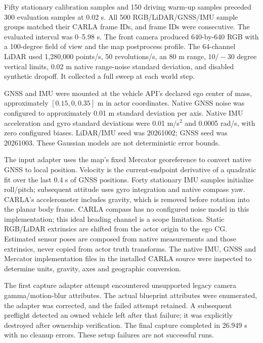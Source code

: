 \documentclass[11pt]{article}
\begin{document}
Fifty stationary calibration samples and 150 driving warm-up samples preceded
300 evaluation samples at 0.02 s. All 500 RGB/LiDAR/GNSS/IMU sample groups
matched their CARLA frame IDs, and frame IDs were consecutive. The evaluated
interval was 0--5.98 s. The front camera produced 640-by-640 RGB with a
100-degree field of view and the map postprocess profile. The 64-channel
LiDAR used 1,280,000 points/s, 50 revolutions/s, an 80 m range,
$10/-30$ degree vertical limits, 0.02 m native range-noise standard deviation,
and disabled synthetic dropoff. It collected a full sweep at each world step.

GNSS and IMU were mounted at the vehicle API's declared ego center of mass,
approximately $[0.15,0,0.35]$ m in actor coordinates. Native GNSS noise was
configured to approximately 0.01 m standard deviation per axis. Native IMU
acceleration and gyro standard deviations were 0.01 m/s$^2$ and
0.0005 rad/s, with zero configured biases. LiDAR/IMU seed was 20261002;
GNSS seed was 20261003. These Gaussian models are not deterministic error bounds.

The input adapter uses the map's fixed Mercator georeference to convert native
GNSS to local position. Velocity is the current-endpoint derivative of a
quadratic fit over the last 0.4 s of GNSS positions. Forty stationary IMU
samples initialize roll/pitch; subsequent attitude uses gyro integration and
native compass yaw. CARLA's accelerometer includes gravity, which is removed
before rotation into the planar body frame. CARLA compass has no configured
noise model in this implementation; this ideal heading channel is a scope
limitation. Static RGB/LiDAR extrinsics are shifted from the actor origin to
the ego CG. Estimated sensor poses are composed from native measurements and
those extrinsics, never copied from actor truth transforms. The native
IMU, GNSS and Mercator implementation files in the installed CARLA source
were inspected to determine units, gravity, axes and geographic conversion.

The first capture adapter attempt encountered unsupported legacy camera
gamma/motion-blur attributes. The actual blueprint attributes were enumerated,
the adapter was corrected, and the failed attempt retained. A subsequent
preflight detected an owned vehicle left after that failure; it was explicitly
destroyed after ownership verification. The final capture completed in
26.949 s with no cleanup errors. These setup failures are not successful runs.
\end{document}
